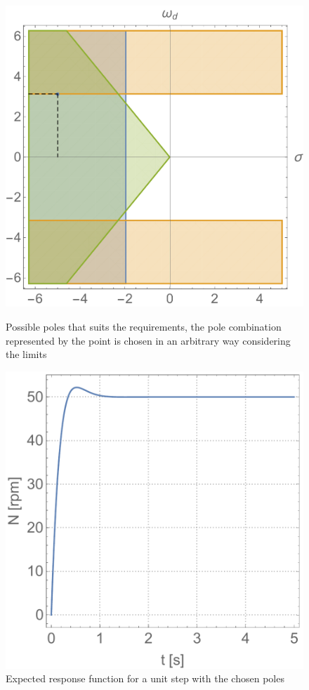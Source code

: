 \documentclass[12pt,english,twoside]{article}
\begin{document}
\begin{figure}[htb!]
	\centering
	\centering
	\includegraphics[width=\textwidth]{figures/polemap_at_50}
	\caption{Possible poles that suits the requirements, the pole combination represented by the point is chosen in an arbitrary way considering the limits}
	\label{polemap_at_50}
	\endminipage\hfill
	\centering
	\includegraphics[width=\textwidth]{figures/expected_50}
	\caption{Expected response function for a unit step with the chosen poles}
	\label{expected_response_50}
	\endminipage\hfill
\end{figure}
\end{document}
